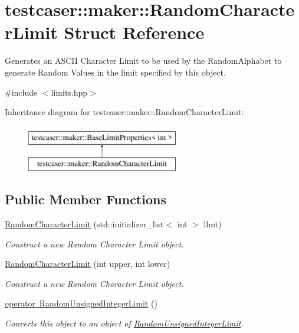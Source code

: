 \hypertarget{structtestcaser_1_1maker_1_1RandomCharacterLimit}{}\section{testcaser\+::maker\+::Random\+Character\+Limit Struct Reference}
\label{structtestcaser_1_1maker_1_1RandomCharacterLimit}


Generates an A\+S\+C\+II Character Limit to be used by the Random\+Alphabet to generate Random Values in the limit specified by this object.  




{\ttfamily \#include $<$limits.\+hpp$>$}

Inheritance diagram for testcaser\+::maker\+::Random\+Character\+Limit\+:\begin{figure}[H]
\begin{center}
\leavevmode
\includegraphics[height=2.000000cm]{structtestcaser_1_1maker_1_1RandomCharacterLimit}
\end{center}
\end{figure}
\subsection*{Public Member Functions}
\begin{DoxyCompactItemize}
\item 
\mbox{\hyperlink{structtestcaser_1_1maker_1_1RandomCharacterLimit_a2ebd894bf7f536219bf7a917ed036c55}{Random\+Character\+Limit}} (std\+::initializer\+\_\+list$<$ int $>$ llmt)
\begin{DoxyCompactList}\small\item\em Construct a new Random Character Limit object. \end{DoxyCompactList}\item 
\mbox{\hyperlink{structtestcaser_1_1maker_1_1RandomCharacterLimit_a7a85c6420ec09f97e648f516a9bb68fd}{Random\+Character\+Limit}} (int upper, int lower)
\begin{DoxyCompactList}\small\item\em Construct a new Random Character Limit object. \end{DoxyCompactList}\item 
\mbox{\hyperlink{structtestcaser_1_1maker_1_1RandomCharacterLimit_a230a33b5d028fdef4a027f7c96663d32}{operator Random\+Unsigned\+Integer\+Limit}} ()
\begin{DoxyCompactList}\small\item\em Converts this object to an object of \mbox{\hyperlink{structtestcaser_1_1maker_1_1RandomUnsignedIntegerLimit}{Random\+Unsigned\+Integer\+Limit}}. \end{DoxyCompactList}\end{DoxyCompactItemize}
